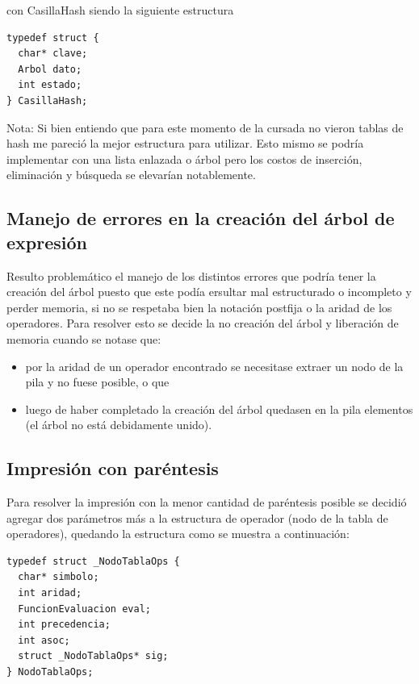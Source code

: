 \documentclass[11pt]{article}
\begin{document}
con CasillaHash siendo la siguiente estructura 

\begin{lstlisting}[style = CStyle]
typedef struct {
  char* clave;
  Arbol dato;
  int estado;
} CasillaHash;
\end{lstlisting}

Nota: Si bien entiendo que para este momento de la cursada no vieron tablas de hash me pareci\'o la mejor estructura para utilizar. Esto mismo se podría implementar con una lista enlazada o \'arbol pero los costos de inserci\'on, eliminaci\'on y b\'usqueda se elevar\'ian notablemente. 

\subsection{Manejo de errores en la creaci\'on del \'arbol de expresi\'on}
Resulto problem\'atico el manejo de los distintos errores que podr\'ia tener la creaci\'on del \'arbol puesto que este pod\'ia ersultar mal estructurado o incompleto y perder memoria, si no se respetaba bien la notaci\'on postfija o la aridad de los operadores. Para resolver esto se decide la no creaci\'on del \'arbol y liberaci\'on de memoria cuando se notase que: 

\begin{itemize}
    \item por la aridad de un operador encontrado se necesitase extraer un nodo de la pila y no fuese posible, o que
    \item luego de haber completado la creaci\'on del \'arbol quedasen en la pila elementos (el \'arbol no est\'a debidamente unido).
\end{itemize}

\subsection{Impresi\'on con par\'entesis}
Para resolver la impresi\'on con la menor cantidad de par\'entesis posible se decidi\'o agregar dos par\'ametros m\'as a la estructura de operador (nodo de la tabla de operadores), quedando la estructura como se muestra a continuaci\'on: 

\begin{lstlisting}[style = CStyle]
typedef struct _NodoTablaOps {
  char* simbolo;
  int aridad;
  FuncionEvaluacion eval;
  int precedencia;
  int asoc;
  struct _NodoTablaOps* sig;
} NodoTablaOps;
\end{lstlisting}
\end{document}
